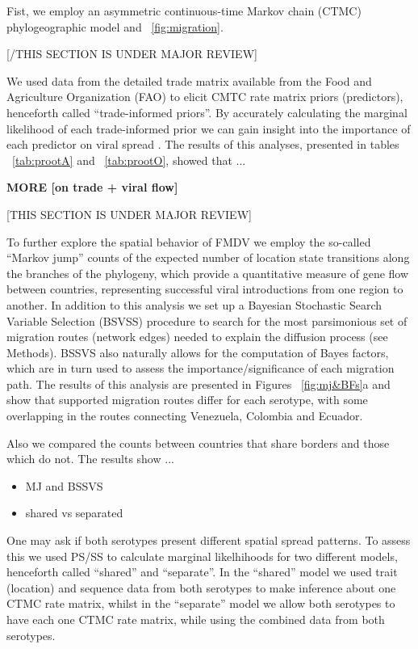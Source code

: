 \documentclass[10pt]{article}
\begin{document}
Fist, we employ an asymmetric continuous-time Markov chain (CTMC) phylogeographic model \cite{roots}  and ~\ref{fig:migration}.

\begin{center}
 [/THIS SECTION IS UNDER MAJOR REVIEW]
\end{center}

We used data from the detailed trade matrix available from the Food and Agriculture Organization (FAO) to elicit CMTC rate matrix priors (predictors), henceforth called ``trade-informed priors''. By accurately calculating the marginal likelihood of each trade-informed prior we can gain insight into the importance of each predictor on viral spread \cite{Carvalho2012,Nelson2011}. The results of this analyses, presented in tables ~\ref{tab:prootA} and ~\ref{tab:prootO}, showed that ...

{{\bf MORE [on trade + viral flow]}}

\begin{center}
 [THIS SECTION IS UNDER MAJOR REVIEW]
\end{center}

To further explore the spatial behavior of FMDV we employ the so-called ``Markov jump'' counts \cite{Minin2008} of the expected number of location state transitions along the  branches of the phylogeny, which  provide a quantitative measure of gene flow between countries, representing successful viral introductions from one region to another. In addition to this analysis we set up a Bayesian Stochastic Search Variable Selection (BSVSS) procedure to search for the most parsimonious set of migration routes (network edges) needed to explain the diffusion process (see Methods). BSSVS also naturally allows for the computation of Bayes factors, which are in turn used to assess the importance/significance of each migration path. The results of this analysis are presented in Figures ~\ref{fig:mj&BFs}a and show that supported migration routes differ for each serotype, with some overlapping in the routes connecting Venezuela, Colombia and Ecuador. 

Also we compared the counts between countries that share borders and those which do not. The results show ... %
\begin{itemize}
 \item MJ and BSSVS
 \item shared vs separated
\end{itemize}

One may ask if both serotypes present different spatial spread patterns. To assess this we used PS/SS to calculate marginal likelhihoods for two different models, henceforth  called ``shared'' and ``separate''. In the ``shared'' model we used trait (location) and sequence data  from both serotypes to make inference about one CTMC rate matrix, whilst in the ``separate'' model we allow both serotypes to have each one CTMC rate matrix, while using the combined data from both serotypes.
\end{document}
